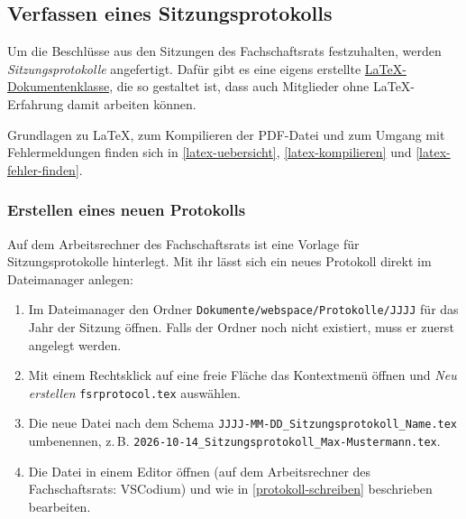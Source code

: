 \subsection{Verfassen eines Sitzungsprotokolls}
\label{protokoll}
Um die Beschlüsse aus den Sitzungen des Fachschaftsrats festzuhalten, werden \textit{Sitzungsprotokolle} angefertigt. Dafür gibt es eine eigens erstellte \hyperref[latex-fsrprotocol]{\LaTeX-Dokumentenklasse}, die so gestaltet ist, dass auch Mitglieder ohne \LaTeX-Erfahrung damit arbeiten können.

Grundlagen zu \LaTeX{}, zum Kompilieren der PDF-Datei und zum Umgang mit Fehlermeldungen finden sich in \autoref{latex-uebersicht}, \autoref{latex-kompilieren} und \autoref{latex-fehler-finden}.

\subsubsection{Erstellen eines neuen Protokolls}
\label{protokoll-erstellen}
Auf dem Arbeitsrechner des Fachschaftsrats ist eine Vorlage für Sitzungsprotokolle hinterlegt. Mit ihr lässt sich ein neues Protokoll direkt im Dateimanager anlegen:


\begin{enumerate}
	\item Im Dateimanager den Ordner \texttt{Dokumente/webspace/Protokolle/JJJJ} für das Jahr der Sitzung öffnen. Falls der Ordner noch nicht existiert, muss er zuerst angelegt werden.
	\item Mit einem Rechtsklick auf eine freie Fläche das Kontextmenü öffnen und
	      \textit{Neu erstellen} \textrightarrow{} \texttt{fsrprotocol.tex} auswählen.
	\item Die neue Datei nach dem Schema \texttt{JJJJ-MM-DD\_Sitzungsprotokoll\_Name.tex} umbenennen,
	      z.\,B. \texttt{2026-10-14\_Sitzungsprotokoll\_Max-Mustermann.tex}.
	\item Die Datei in einem Editor öffnen (auf dem Arbeitsrechner des Fachschaftsrats: VSCodium) und wie in \autoref{protokoll-schreiben} beschrieben bearbeiten.
\end{enumerate}

